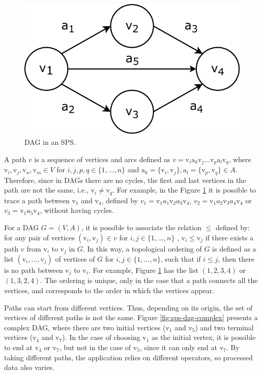 \begin{figure}[ht!]
  \centering
    \includegraphics[scale=0.6]{figures/concepts/SPS-DAG.pdf}
  \caption{DAG in an SPS.}
  \label{fig:sps-dag}
\end{figure}

A path $v$ is a sequence of vertices and arcs defined as $v=\text{v}_i\text{a}_k\text{v}_j...\text{v}_p\text{a}_l\text{v}_{q}$, where $\text{v}_i, \text{v}_j, \text{v}_n, \text{v}_m \in V$ for $i,j,p,q \in \{1,...,n\}$ and $\text{a}_k=\{\text{v}_i,\text{v}_j\}, \text{a}_l=\{\text{v}_p,\text{v}_q\} \in A$. Therefore, since in DAGs there are no cycles, the first and last vertices in the path are not the same, i.e., $\text{v}_i \neq \text{v}_q$. For example, in the Figure \ref{fig:sps-dag} it is possible to trace a path between $\text{v}_1$ and $\text{v}_4$, defined by $v_1=\text{v}_1a_1\text{v}_2a_3\text{v}_4$, $v_2=\text{v}_1a_2\text{v}_3a_4\text{v}_4$ or $v_3=\text{v}_1a_5\text{v}_4$, without having cycles.

For a DAG $G=(V,A)$, it is possible to associate the relation $\le$ defined by: for any pair of vertices $(\text{v}_i,\text{v}_j) \in v$ for $i, j \in \{1,...,n\}$ , $\text{v}_i \le \text{v}_j$ if there exists a path $v$ from $\text{v}_i$ to $\text{v}_j$ in $G$. In this way, a topological ordering of $G$ is defined as a list $(\text{v}_i,...,\text{v}_j)$ of vertices of $G$ for $i,j \in \{1,...,n\}$, such that if $i \le j$, then there is no path between $\text{v}_j$ to $\text{v}_i$. For example, Figure \ref{fig:sps-dag} has the list $(1,2,3,4)$ or $(1,3,2,4)$. The ordering is unique, only in the case that a path connects all the vertices, and corresponds to the order in which the vertices appear.

Paths can start from different vertices. Thus, depending on its origin, the set of vertices of different paths is not the same. Figure \ref{fig:sps-dag-complex} presents a complex DAG, where there are two initial vertices ($\text{v}_1$ and $\text{v}_5$) and two terminal vertices ($\text{v}_4$ and $\text{v}_7$). In the case of choosing $\text{v}_1$ as the initial vertex, it is possible to end at $\text{v}_4$ or $\text{v}_7$, but not in the case of $\text{v}_5$, since it can only end at $\text{v}_7$. By taking different paths, the application relies on different operators, so processed data also varies.

